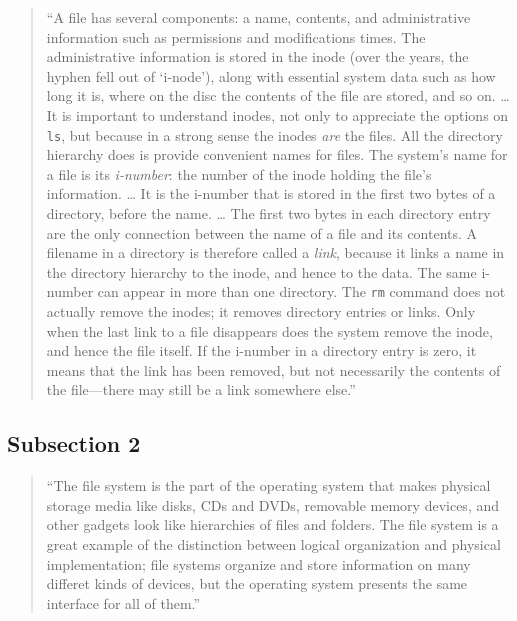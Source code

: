 \documentclass[]{tufte-book}
\begin{document}
\begin{quote}
``A file has several components: a name, contents, and administrative information such as
permissions and modifications times. The administrative information is stored in the inode
(over the years, the hyphen fell out of `i-node'), along with essential system data such as
how long it is, where on the disc the contents of the file are stored, and so on. \ldots{}
It is important to understand inodes, not only to appreciate the options on \texttt{ls}, but because
in a strong sense the inodes \emph{are} the files. All the directory hierarchy does is provide
convenient names for files. The system's name for a file is its \emph{i-number}: the number of the
inode holding the file's information. \ldots{} It is the i-number that is stored in the first two bytes
of a directory, before the name. \ldots{}
The first two bytes in each directory entry are the only connection between the name of a file and its
contents. A filename in a directory is therefore called a \emph{link}, because it links a name in the
directory hierarchy to the inode, and hence to the data. The same i-number can appear in more than
one directory. The \texttt{rm} command does not actually remove the inodes; it removes directory entries
or links. Only when the last link to a file disappears does the system remove the inode, and hence
the file itself. If the i-number in a directory entry is zero, it means that the link has been
removed, but not necessarily the contents of the file---there may still be a link somewhere else.'' \citep{kernighan1984unix}
\end{quote}

\hypertarget{subsection-2-1}{%
\subsection{Subsection 2}\label{subsection-2-1}}

\begin{quote}
``The file system is the part of the operating system that makes physical storage media
like disks, CDs and DVDs, removable memory devices, and other gadgets look like hierarchies
of files and folders. The file system is a great example of the distinction between
logical organization and physical implementation; file systems organize and store
information on many differet kinds of devices, but the operating system presents the
same interface for all of them.'' \citep{kernighan2011d}
\end{quote}
\end{document}
